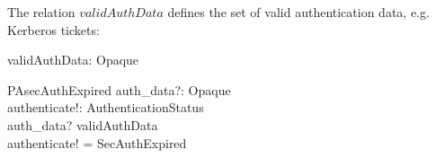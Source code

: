 The relation $validAuthData$ defines the set of valid authentication data, e.g.
Kerberos tickets:


\begin{axdef}
  validAuthData: \power Opaque \\
\end{axdef}

\begin{schema}{PAsecAuthExpired}
  auth\_data?: Opaque \\
  authenticate!: AuthenticationStatus \\
  \where
  auth\_data? \notin validAuthData \\
  authenticate! = SecAuthExpired \\
\end{schema}


